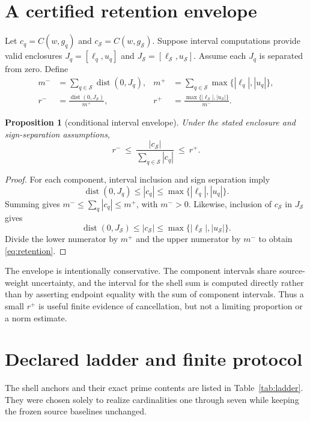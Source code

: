 \documentclass[11pt]{article}
\newtheorem{proposition}[theorem]{Proposition}
\newcommand{\1}{\mathbf{1}}
\newcommand{\dist}{\operatorname{dist}}
\newcommand{\shell}{\mathcal S}
\begin{document}
\section{A certified retention envelope}

Let $c_q=C(w,g_q)$ and $c_{\shell}=C(w,g_{\shell})$.  Suppose interval
computations provide valid enclosures $J_q=[\ell_q,u_q]$ and
$J_{\shell}=[\ell_{\shell},u_{\shell}]$.  Assume each $J_q$ is separated from
zero.  Define
\begin{align}
 m^-&=\sum_{q\in\shell}\dist(0,J_q), &
 m^+&=\sum_{q\in\shell}\max\{|\ell_q|,|u_q|\}, \\
 r^-&=\frac{\dist(0,J_{\shell})}{m^+}, &
 r^+&=\frac{\max\{|\ell_{\shell}|,|u_{\shell}|\}}{m^-}.
 \label{eq:envelope}
\end{align}

\begin{proposition}[conditional interval envelope]
Under the stated enclosure and sign-separation assumptions,
\begin{equation}
 r^-\ \le\ \frac{|c_{\shell}|}{\sum_{q\in\shell}|c_q|}\ \le\ r^+.
 \label{eq:retention}
\end{equation}
\end{proposition}

\begin{proof}
For each component, interval inclusion and sign separation imply
\[
 \dist(0,J_q)\le |c_q|\le\max\{|\ell_q|,|u_q|\}.
\]
Summing gives $m^-\le\sum_q|c_q|\le m^+$, with $m^->0$.  Likewise,
inclusion of $c_{\shell}$ in $J_{\shell}$ gives
\[
 \dist(0,J_{\shell})\le |c_{\shell}|
 \le\max\{|\ell_{\shell}|,|u_{\shell}|\}.
\]
Divide the lower numerator by $m^+$ and the upper numerator by $m^-$ to
obtain \eqref{eq:retention}.
\end{proof}

The envelope is intentionally conservative.  The component intervals share
source-weight uncertainty, and the interval for the shell sum is computed
directly rather than by asserting endpoint equality with the sum of component
intervals.  Thus a small $r^+$ is useful finite evidence of cancellation, but
not a limiting proportion or a norm estimate.

\section{Declared ladder and finite protocol}

The shell anchors and their exact prime contents are listed in
Table~\ref{tab:ladder}.  They were chosen solely to realize cardinalities one
through seven while keeping the frozen source baselines unchanged.
\end{document}
